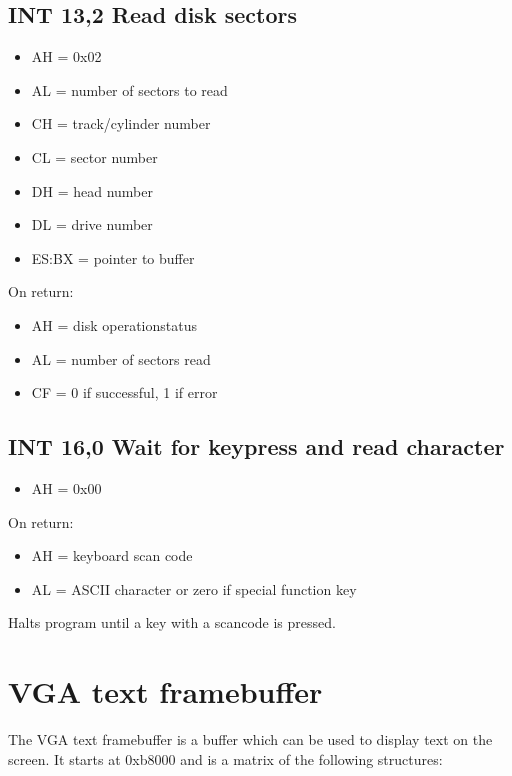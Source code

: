 \subsection{INT 13,2 Read disk sectors}
\begin{itemize}
  \item
    AH = 0x02
  \item
    AL = number of sectors to read
  \item
    CH = track/cylinder number
  \item
    CL = sector number
  \item
    DH = head number
  \item
    DL = drive number
  \item
    ES:BX = pointer to buffer
\end{itemize}

On return:

\begin{itemize}
  \item
    AH = disk operationstatus
  \item
    AL = number of sectors read
  \item
    CF = 0 if successful, 1 if error
\end{itemize}
%
%
\subsection{INT 16,0 Wait for keypress and read character}
\begin{itemize}
  \item
    AH = 0x00
\end{itemize}

On return:

\begin{itemize}
  \item
    AH = keyboard scan code
  \item
    AL = ASCII character or zero if special function key
\end{itemize}

Halts program until a key with a scancode is pressed.

%
%
\section{VGA text framebuffer}

The VGA text framebuffer is a buffer which can be used to display text on the
screen. It starts at 0xb8000 and is a matrix of the following structures:

